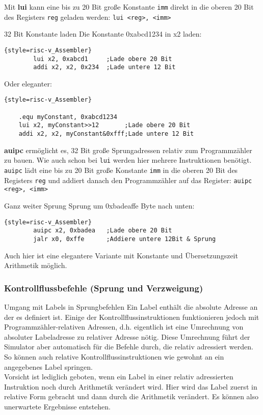{Mit \textbf{lui} kann eine bis zu 20 Bit große Konstante \texttt{imm} direkt in die oberen 20 Bit des Registers \texttt{reg} geladen werden:
\texttt{lui <reg>, <imm>}
\begin{exampleblock}{32 Bit Konstante laden}
		Die Konstante 0xabcd1234 in x2 laden:\\
	\begin{lstlisting}{style=risc-v_Assembler}
		lui x2, 0xabcd1 	;Lade obere 20 Bit
		addi x2, x2, 0x234	;Lade untere 12 Bit
	\end{lstlisting}
	Oder eleganter:\\
	\begin{lstlisting}{style=risc-v_Assembler}
	
	.equ myConstant, 0xabcd1234
	lui x2, myConstant>>12		 ;Lade obere 20 Bit
	addi x2, x2, myConstant&0xfff;Lade untere 12 Bit
	\end{lstlisting}
\end{exampleblock}
\textbf{auipc} ermöglicht es, 32 Bit große Sprungadressen relativ zum Programmzähler zu bauen. Wie auch schon bei \texttt{lui} werden hier mehrere Instruktionen benötigt. \texttt{auipc} lädt eine bis zu 20 Bit große Konstante \texttt{imm} in die oberen 20 Bit des Registers \texttt{reg} und addiert danach den Programmzähler auf das Register:
\texttt{auipc <reg>, <imm>}
\begin{exampleblock}{Ganz weiter Sprung}
	Sprung um 0xbadeaffe Byte nach unten:
	\begin{lstlisting}{style=risc-v_Assembler}
		auipc x2, 0xbadea	;Lade obere 20 Bit
		jalr x0, 0xffe		;Addiere untere 12Bit & Sprung
	\end{lstlisting}
	Auch hier ist eine elegantere Variante mit Konstante und Übersetzungszeit Arithmetik möglich.
\end{exampleblock}

\subsubsection{Kontrollflussbefehle (Sprung und Verzweigung)}
\label{manual-riscv-jump-instructions}
\begin{infoblock}{Umgang mit Labels in Sprungbefehlen}
	Ein Label enthält die absolute Adresse an der es definiert ist. Einige der Kontrollflussinstruktionen funktionieren jedoch mit Programmzähler-relativen Adressen, d.h. eigentlich ist eine Umrechnung von absoluter Labeladresse zu relativer Adresse nötig. Diese Umrechnung führt der Simulator aber automatisch für die Befehle durch, die relativ adressiert werden. So können auch relative Kontrollflussinstruktionen wie gewohnt an ein angegebenes Label springen.\\
	Vorsicht ist lediglich geboten, wenn ein Label in einer relativ adressierten Instruktion noch durch Arithmetik verändert wird. Hier wird das Label zuerst in relative Form gebracht und dann durch die Arithmetik verändert. Es können also unerwartete Ergebnisse entstehen.
\end{infoblock}


}
